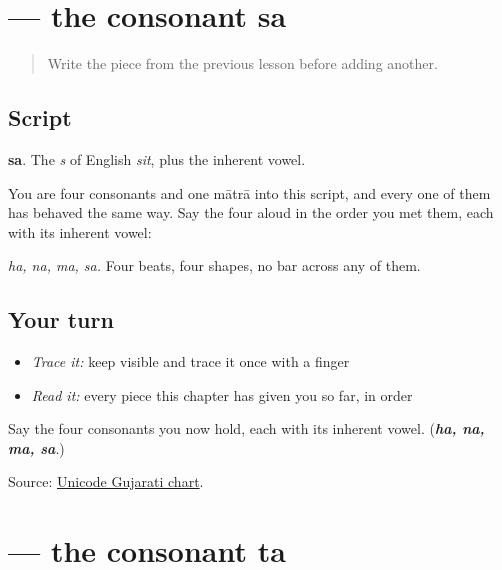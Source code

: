 \section[sa]{ — the consonant sa}

\label{lesson:GU-W01-sa}



\begin{quote}
Write the piece from the previous lesson before adding another.
\end{quote}

\subsection*{Script}
\begin{quote}
\end{quote}

\textbf{sa}. The \emph{s} of English \emph{sit}, plus the inherent vowel.

You are four consonants and one mātrā into this script, and every one of them has behaved the same way. Say the four aloud in the order you met them, each with its inherent vowel:

\begin{quote}
\textbf{}   \textbf{}   \textbf{}   \textbf{}
\end{quote}

\emph{ha, na, ma, sa.} Four beats, four shapes, no bar across any of them.

\subsection*{Your turn}
\begin{itemize}
\raggedright
  \item \emph{Trace it:} keep  visible and trace it once with a finger
  \item \emph{Read it:} every piece this chapter has given you so far, in order
\end{itemize}

\begin{tcolorbox}[breakable,colback=teal!4,colframe=teal!35!black,title={Before you move on}]
Say the four consonants you now hold, each with its inherent vowel. (\emph{\textbf{ha, na, ma, sa}}.)

Source: \href{https://www.unicode.org/charts/PDF/U0A80.pdf}{Unicode Gujarati chart}.
\end{tcolorbox}
\section[ta]{ — the consonant ta}

